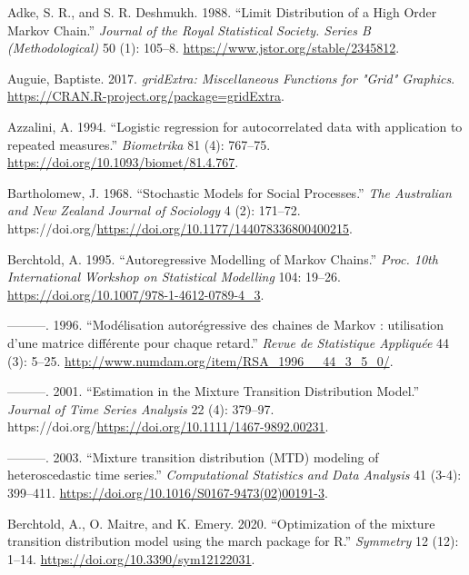 \hypertarget{refs}{}
\begin{CSLReferences}{1}{0}
\leavevmode{}%
Adke, S. R., and S. R. Deshmukh. 1988. {``{Limit Distribution of a High Order Markov Chain}.''} \emph{Journal of the Royal Statistical Society. Series B (Methodological)} 50 (1): 105--8. \url{https://www.jstor.org/stable/2345812}.

\leavevmode{}%
Auguie, Baptiste. 2017. \emph{gridExtra: Miscellaneous Functions for "Grid" Graphics}. \url{https://CRAN.R-project.org/package=gridExtra}.

\leavevmode{}%
Azzalini, A. 1994. {``{Logistic regression for autocorrelated data with application to repeated measures}.''} \emph{Biometrika} 81 (4): 767--75. \url{https://doi.org/10.1093/biomet/81.4.767}.

\leavevmode{}%
Bartholomew, J. 1968. {``{Stochastic Models for Social Processes}.''} \emph{The Australian and New Zealand Journal of Sociology} 4 (2): 171--72. https://doi.org/\url{https://doi.org/10.1177/144078336800400215}.

\leavevmode{}%
Berchtold, A. 1995. {``{Autoregressive Modelling of Markov Chains}.''} \emph{Proc. 10th International Workshop on Statistical Modelling} 104: 19--26. \url{https://doi.org/10.1007/978-1-4612-0789-4_3}.

\leavevmode{}%
---------. 1996. {``{Modélisation autorégressive des chaines de Markov : utilisation d'une matrice différente pour chaque retard}.''} \emph{Revue de Statistique Appliquée} 44 (3): 5--25. \url{http://www.numdam.org/item/RSA_1996__44_3_5_0/}.

\leavevmode{}%
---------. 2001. {``Estimation in the Mixture Transition Distribution Model.''} \emph{Journal of Time Series Analysis} 22 (4): 379--97. https://doi.org/\url{https://doi.org/10.1111/1467-9892.00231}.

\leavevmode{}%
---------. 2003. {``{Mixture transition distribution (MTD) modeling of heteroscedastic time series}.''} \emph{Computational Statistics and Data Analysis} 41 (3-4): 399--411. \url{https://doi.org/10.1016/S0167-9473(02)00191-3}.

\leavevmode{}%
Berchtold, A., O. Maitre, and K. Emery. 2020. {``{Optimization of the mixture transition distribution model using the march package for R}.''} \emph{Symmetry} 12 (12): 1--14. \url{https://doi.org/10.3390/sym12122031}.


\end{CSLReferences}
